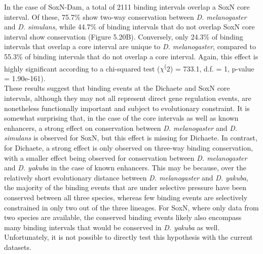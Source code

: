 In the case of SoxN-Dam, a total of 2111 binding intervals overlap a SoxN core interval. Of these, 75.7\% show two-way conservation between \emph{D. melanogaster} and \emph{D. simulans}, while 44.7\% of binding intervals that do not overlap SoxN core interval show conservation (Figure 5.20B). Conversely, only 24.3\% of binding intervals that overlap a core interval are unique to \emph{D. melanogaster}, compared to 55.3\% of binding intervals that do not overlap a core interval. Again, this effect is highly significant according to a chi-squared test (\(\chi\)\textsuperscript(2) = 733.1, d.f. = 1, p-value = 1.90e-161).\\  

These results suggest that binding events at the Dichaete and SoxN core intervals, although they may not all represent direct gene regulation events, are nonetheless functionally important and subject to evolutionary constraint. It is somewhat surprising that, in the case of the core intervals as well as known enhancers, a strong effect on conservation between \emph{D. melanogaster} and \emph{D. simulans} is observed for SoxN, but this effect is missing for Dichaete. In contrast, for Dichaete, a strong effect is only observed on three-way binding conservation, with a smaller effect being observed for conservation between \emph{D. melanogaster} and \emph{D. yakuba} in the case of known enhancers. This may be because, over the relatively short evolutionary distance between \emph{D. melanogaster} and \emph{D. yakuba}, the majority of the binding events that are under selective pressure have been conserved between all three species, whereas few binding events are selectively constrained in only two out of the three lineages. For SoxN, where only data from two species are available, the conserved binding events likely also encompass many binding intervals that would be conserved in \emph{D. yakuba} as well. Unfortunately, it is not possible to directly test this hypothesis with the current datasets.

